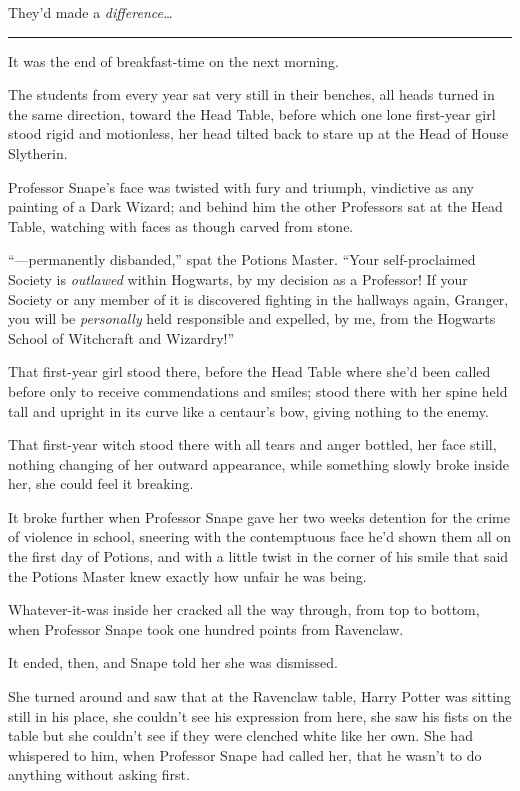 They'd made a \emph{difference\ldots{}}

\begin{center}\rule{3in}{0.4pt}\end{center}

It was the end of breakfast-time on the next morning.

The students from every year sat very still in their benches, all heads
turned in the same direction, toward the Head Table, before which one
lone first-year girl stood rigid and motionless, her head tilted back to
stare up at the Head of House Slytherin.

Professor Snape's face was twisted with fury and triumph, vindictive as
any painting of a Dark Wizard; and behind him the other Professors sat
at the Head Table, watching with faces as though carved from stone.

``---permanently disbanded,'' spat the Potions Master. ``Your
self-proclaimed Society is \emph{outlawed} within Hogwarts, by my
decision as a Professor! If your Society or any member of it is
discovered fighting in the hallways again, Granger, you will be
\emph{personally} held responsible and expelled, by me, from the
Hogwarts School of Witchcraft and Wizardry!''

That first-year girl stood there, before the Head Table where she'd been
called before only to receive commendations and smiles; stood there with
her spine held tall and upright in its curve like a centaur's bow,
giving nothing to the enemy.

That first-year witch stood there with all tears and anger bottled, her
face still, nothing changing of her outward appearance, while something
slowly broke inside her, she could feel it breaking.

It broke further when Professor Snape gave her two weeks detention for
the crime of violence in school, sneering with the contemptuous face
he'd shown them all on the first day of Potions, and with a little twist
in the corner of his smile that said the Potions Master knew exactly how
unfair he was being.

Whatever-it-was inside her cracked all the way through, from top to
bottom, when Professor Snape took one hundred points from Ravenclaw.

It ended, then, and Snape told her she was dismissed.

She turned around and saw that at the Ravenclaw table, Harry Potter was
sitting still in his place, she couldn't see his expression from here,
she saw his fists on the table but she couldn't see if they were
clenched white like her own. She had whispered to him, when Professor
Snape had called her, that he wasn't to do anything without asking
first.

